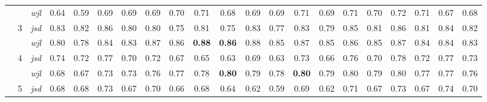 \begin{table}[ht]
{{\begin{tabular}{ccccccccccccccccccccc}
\multicolumn{1}{c|}{} &  & \multicolumn{1}{c|}{\textit{wjl}} & 0.64 & \multicolumn{1}{c|}{0.59} & \cellcolor{gray!25}0.69 & \multicolumn{1}{c|}{\cellcolor{gray!25}0.69} & 0.69 & \multicolumn{1}{c|}{0.70} & 0.71 & \multicolumn{1}{c|}{0.68} & 0.69 & \multicolumn{1}{c|}{0.69} & 0.71 & \multicolumn{1}{c|}{0.69} & 0.71 & \multicolumn{1}{c|}{0.70} & 0.72 & \multicolumn{1}{c|}{0.71} & 0.67 & \multicolumn{1}{c|}{0.68} \\ \cline{2-21} 
\multicolumn{1}{c|}{} & \multirow{2}{*}{3} & \multicolumn{1}{c|}{\textit{jsd}} & 0.83 & \multicolumn{1}{c|}{0.82} & 0.86 & \multicolumn{1}{c|}{0.80} & \cellcolor{gray!25}0.80 & \multicolumn{1}{c|}{\cellcolor{gray!25}0.75} & 0.81 & \multicolumn{1}{c|}{0.75} & 0.83 & \multicolumn{1}{c|}{0.77} & 0.83 & \multicolumn{1}{c|}{0.79} & 0.85 & \multicolumn{1}{c|}{0.81} & 0.86 & \multicolumn{1}{c|}{0.81} & 0.84 & \multicolumn{1}{c|}{0.82} \\
\multicolumn{1}{c|}{} &  & \multicolumn{1}{c|}{\textit{wjl}} & 0.80 & \multicolumn{1}{c|}{0.78} & 0.84 & \multicolumn{1}{c|}{0.83} & \cellcolor{gray!25}0.87 & \multicolumn{1}{c|}{\cellcolor{gray!25}0.86} & \textbf{0.88} & \multicolumn{1}{c|}{\textbf{0.86}} & 0.88 & \multicolumn{1}{c|}{0.85} & 0.87 & \multicolumn{1}{c|}{0.85} & 0.86 & \multicolumn{1}{c|}{0.85} & 0.87 & \multicolumn{1}{c|}{0.84} & 0.84 & \multicolumn{1}{c|}{0.83} \\ \cline{2-21} 
\multicolumn{1}{c|}{} & \multirow{2}{*}{4} & \multicolumn{1}{c|}{\textit{jsd}} & 0.74 & \multicolumn{1}{c|}{0.72} & 0.77 & \multicolumn{1}{c|}{0.70} & 0.72 & \multicolumn{1}{c|}{0.67} & \cellcolor{gray!25}0.65 & \multicolumn{1}{c|}{\cellcolor{gray!25}0.63} & 0.69 & \multicolumn{1}{c|}{0.63} & 0.73 & \multicolumn{1}{c|}{0.66} & 0.76 & \multicolumn{1}{c|}{0.70} & 0.78 & \multicolumn{1}{c|}{0.72} & 0.77 & \multicolumn{1}{c|}{0.73} \\
\multicolumn{1}{c|}{} &  & \multicolumn{1}{c|}{\textit{wjl}} & 0.68 & \multicolumn{1}{c|}{0.67} & 0.73 & \multicolumn{1}{c|}{0.73} & 0.76 & \multicolumn{1}{c|}{0.77} & \cellcolor{gray!25}0.78 & \multicolumn{1}{c|}{\cellcolor{gray!25}\textbf{0.80}} & 0.79 & \multicolumn{1}{c|}{0.78} & \textbf{0.80} & \multicolumn{1}{c|}{0.79} & 0.80 & \multicolumn{1}{c|}{0.79} & 0.80 & \multicolumn{1}{c|}{0.77} & 0.77 & \multicolumn{1}{c|}{0.76} \\ \cline{2-21} 
\multicolumn{1}{c|}{} & \multirow{2}{*}{5} & \multicolumn{1}{c|}{\textit{jsd}} & 0.68 & \multicolumn{1}{c|}{0.68} & 0.73 & \multicolumn{1}{c|}{0.67} & 0.70 & \multicolumn{1}{c|}{0.66} & 0.68 & \multicolumn{1}{c|}{0.64} & \cellcolor{gray!25}0.62 & \multicolumn{1}{c|}{\cellcolor{gray!25}0.59} & 0.69 & \multicolumn{1}{c|}{0.62} & 0.71 & \multicolumn{1}{c|}{0.67} & 0.73 & \multicolumn{1}{c|}{0.67} & 0.74 & \multicolumn{1}{c|}{0.70} \\

\end{tabular}}}
\end{table}

